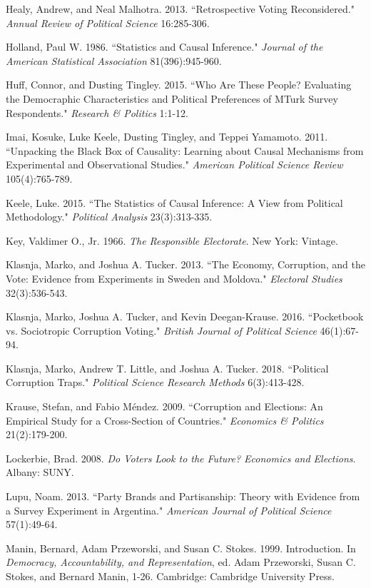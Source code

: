 \documentclass[11pt]{article}
\begin{document}
\begin{thebibliography}{56}
Healy, Andrew, and Neal Malhotra. 2013. “Retrospective Voting Reconsidered." \textit{Annual Review of Political Science} 16:285-306.

Holland, Paul W. 1986. “Statistics and Causal Inference." \textit{Journal of the American Statistical Association} 81(396):945-960.

Huff, Connor, and Dusting Tingley. 2015. “Who Are These People? Evaluating the Democraphic Characteristics and Political Preferences of MTurk Survey Respondents." \textit{Research \& Politics} 1:1-12.

Imai, Kosuke, Luke Keele, Dusting Tingley, and Teppei Yamamoto. 2011. “Unpacking the Black Box of Causality: Learning about Causal Mechanisms from Experimental and Observational Studies." \textit{American Political Science Review} 105(4):765-789.

Keele, Luke. 2015. “The Statistics of Causal Inference: A View from Political Methodology." \textit{Political Analysis} 23(3):313-335.

Key, Valdimer O., Jr. 1966. \textit{The Responsible Electorate}. New York: Vintage.

Klasnja, Marko, and Joshua A. Tucker. 2013. “The Economy, Corruption, and the Vote: Evidence from Experiments in Sweden and Moldova." \textit{Electoral Studies} 32(3):536-543.

Klasnja, Marko, Joshua A. Tucker, and Kevin Deegan-Krause. 2016. “Pocketbook vs. Sociotropic Corruption Voting." \textit{British Journal of Political Science} 46(1):67-94.

Klasnja, Marko, Andrew T. Little, and Joshua A. Tucker. 2018. “Political Corruption Traps." \textit{Political Science Research Methods} 6(3):413-428.

Krause, Stefan, and Fabio Méndez. 2009. “Corruption and Elections: An Empirical Study for a Cross-Section of Countries." \textit{Economics \& Politics} 21(2):179-200.

Lockerbie, Brad. 2008. \textit{Do Voters Look to the Future? Economics and Elections}. Albany: SUNY.

Lupu, Noam. 2013. “Party Brands and Partisanship: Theory with Evidence from a Survey Experiment in Argentina." \textit{American Journal of Political Science} 57(1):49-64.

Manin, Bernard, Adam Przeworski, and Susan C. Stokes. 1999. Introduction. In \textit{Democracy, Accountability, and Representation}, ed. Adam Przeworski, Susan C. Stokes, and Bernard Manin, 1-26. Cambridge: Cambridge University Press. 


\end{thebibliography}
\end{document}
